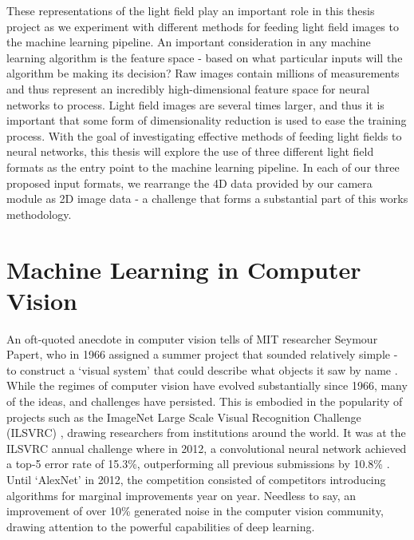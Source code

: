 These representations of the light field play an important role in this thesis project as we experiment with different methods for feeding light field images to the machine learning pipeline. An important consideration in any machine learning algorithm is the feature space - based on what particular inputs will the algorithm be making its decision? Raw images contain millions of measurements and thus represent an incredibly high-dimensional feature space for neural networks to process. Light field images are several times larger, and thus it is important that some form of dimensionality reduction is used to ease the training process. With the goal of investigating effective methods of feeding light fields to neural networks, this thesis will explore the use of three different light field formats as the entry point to the machine learning pipeline. In each of our three proposed input formats, we rearrange the 4D data provided by our camera module as 2D image data - a challenge that forms a substantial part of this works methodology.

\section{Machine Learning in Computer Vision}


An oft-quoted anecdote in computer vision tells of MIT researcher Seymour Papert, who in 1966 assigned a summer project that sounded relatively simple - to construct a `visual system' that could describe what objects it saw by name \cite{papert1966vision}. While the regimes of computer vision have evolved substantially since 1966, many of the ideas, and challenges have persisted. This is embodied in the popularity of projects such as the ImageNet Large Scale Visual Recognition Challenge (ILSVRC) \cite{ilsvrc}, drawing researchers from institutions around the world. It was at the ILSVRC annual challenge where in 2012, a convolutional neural network achieved a top-5 error rate of 15.3\%, outperforming all previous submissions by 10.8\% \cite{krizhevsky2012alexnet}. Until `AlexNet' in 2012, the competition consisted of competitors introducing algorithms for marginal improvements year on year. Needless to say, an improvement of over 10\% generated noise in the computer vision community, drawing attention to the powerful capabilities of deep learning.

